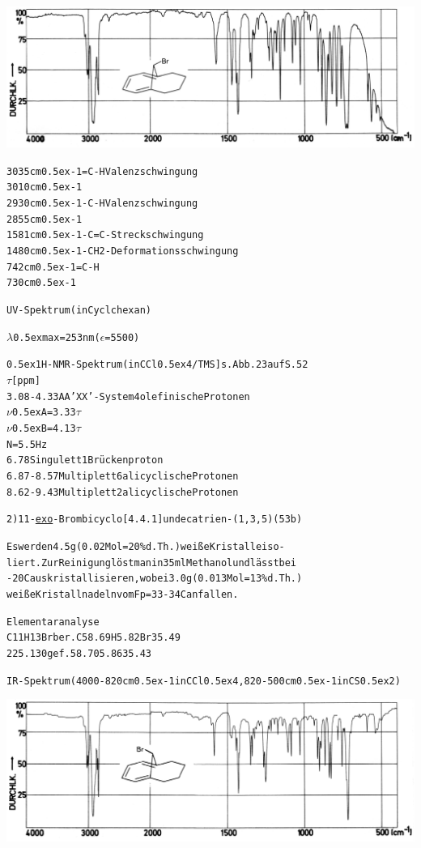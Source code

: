 \documentclass[a4paper,11pt]{article}
\begin{document}
\hspace*{-0.5cm}\includegraphics[width=14.87cm]{IR_050}
\begin{alltt}

3035 cm\raise0.5ex\hbox{-1} =C-H  Valenzschwingung
3010 cm\raise0.5ex\hbox{-1}
2930 cm\raise0.5ex\hbox{-1} -C-H  Valenzschwingung
2855 cm\raise0.5ex\hbox{-1}
1581 cm\raise0.5ex\hbox{-1} -C=C- Streckschwingung
1480 cm\raise0.5ex\hbox{-1} -CH2- Deformationsschwingung
 742 cm\raise0.5ex\hbox{-1} =C-H
 730 cm\raise0.5ex\hbox{-1}



UV-Spektrum (in Cyclchexan)

\(\lambda\)\lower0.5ex\hbox{max} = 253 nm (\(\epsilon\) = 5500)

\leavevmode\raise0.5ex\hbox{1}H-NMR-Spektrum (in CCl\lower0.5ex\hbox{4}/TMS] s. Abb. 23 auf S. 52
  \(\tau\) [ppm]
3.08 - 4.33  AA'XX'-System    4 olefinische Protonen
             \(\nu\)\lower0.5ex\hbox{A} = 3.33\(\tau\)
             \(\nu\)\lower0.5ex\hbox{B} = 4.13\(\tau\)
             N = 5.5 Hz
6.78         Singulett        1 Brückenproton
6.87 - 8.57  Multiplett       6 alicyclische Protonen
8.62 - 9.43  Multiplett       2 alicyclische Protonen

\newpage
{}


2) 11-\underline{exo}-Brombicyclo[4.4.1]undecatrien-(1‚3,5) (53b)

Es werden 4.5 g (0.02 Mol = 20 \% d.Th.) weiße Kristalle iso-
liert. Zur Reinigung löst man in 35 ml Methanol und lässt bei
-20\degree{}C auskristallisieren, wobei 3.0 g (0.013 Mol = 13 \% d.Th.)
weiße Kristallnadeln vom Fp = 33 - 34\degree{}C anfallen.

Elementaranalyse
C11H13Br ber. C 58.69  H 5.82  Br 35.49
225.130  gef.   58.70    5.86     35.43

IR-Spektrum (4000-820 cm\raise0.5ex\hbox{-1} in CCl\lower0.5ex\hbox{4}, 820-500 cm\raise0.5ex\hbox{-1} in CS\lower0.5ex\hbox{2})
\end{alltt}
\hspace*{-0.5cm}\includegraphics[width=14.85cm]{IR_051}
\end{document}
